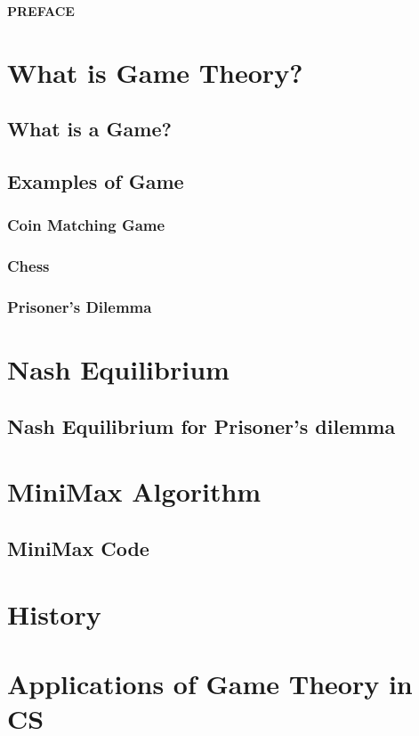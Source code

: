\documentclass[letterpaper,12pt,oneside]{report}
\begin{document}
\vspace*{8\baselineskip}
\newpage
\begin{Large}
\begin{centering}
\textbf{PREFACE}
\\
\end{centering}
\vspace{5mm}



\end{Large}
\Large

\tableofcontents
\listoffigures
\listoftables
\newpage
\chapter{What is Game Theory?}

\newpage
\section{What is a Game?}

\newpage
\section{Examples of Game}
\subsection{Coin Matching Game}

\newpage
\subsection{Chess}

\newpage
\subsection{Prisoner's Dilemma}

\newpage
\chapter{Nash Equilibrium}

\newpage
\section{Nash Equilibrium for Prisoner's dilemma}

\newpage
\chapter{MiniMax Algorithm}

\newpage
\section{MiniMax Code}

\chapter{History}

\newpage
\chapter{Applications of Game Theory in CS}

\newpage


\end{document}
